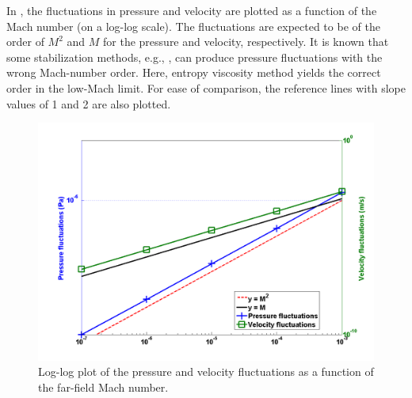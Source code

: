 %
In , the fluctuations in pressure and velocity are plotted as a function of the Mach number (on a log-log scale). The fluctuations are expected to be of the order of $M^2$ and $M$ for the pressure and velocity, respectively. It is known that some stabilization methods, e.g., \cite{LowMach1, LowMach2, LowMach3}, can produce pressure fluctuations with the wrong Mach-number order. Here, entropy viscosity method yields the correct order in the low-Mach limit. For ease of comparison, the reference lines with slope values of 1 and 2 are also plotted.
%
\begin{figure}[H]
\centering
\includegraphics[width=\textwidth]{figures/pressure_fluctuation.png}
\caption{Log-log plot of the pressure and velocity fluctuations as a function of the far-field Mach number.}
\label{fig:pressure_vel_fluc}
\end{figure}

